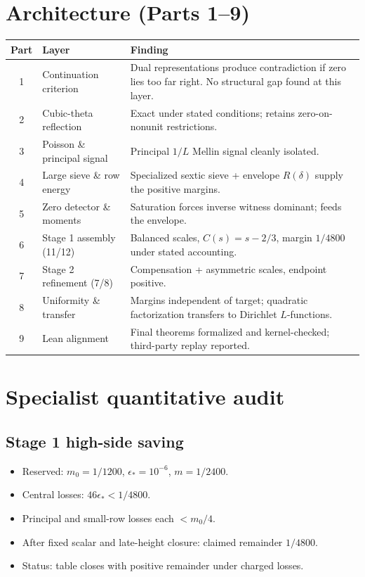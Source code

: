 \documentclass[11pt]{article}
\begin{document}
\section{Architecture (Parts 1--9)}
\begin{center}\small
\begin{tabularx}{\linewidth}{@{}c>{\raggedright\arraybackslash}p{3.9cm}Y@{}}
\toprule
\textbf{Part} & \textbf{Layer} & \textbf{Finding}\\ & Continuation criterion & Dual representations produce contradiction if zero lies too far right. No structural gap found at this layer.\\
2 & Cubic-theta reflection & Exact under stated conditions; retains zero-on-nonunit restrictions.\\
3 & Poisson \& principal signal & Principal $1/L$ Mellin signal cleanly isolated.\\
4 & Large sieve \& row energy & Specialized sextic sieve + envelope $R(\delta)$ supply the positive margins.\\
5 & Zero detector \& moments & Saturation forces inverse witness dominant; feeds the envelope.\\
6 & Stage 1 assembly (11/12) & Balanced scales, $C(s)=s-2/3$, margin $1/4800$ under stated accounting.\\
7 & Stage 2 refinement (7/8) & Compensation + asymmetric scales, endpoint positive.\\
8 & Uniformity \& transfer & Margins independent of target; quadratic factorization transfers to Dirichlet $L$-functions.\\
9 & Lean alignment & Final theorems formalized and kernel-checked; third-party replay reported.\\
\bottomrule
\end{tabularx}\end{center}

\section{Specialist quantitative audit}
\subsection*{Stage 1 high-side saving}
\begin{itemize}[leftmargin=1.4em,itemsep=0.15em]
\item Reserved: $m_0=1/1200$, $\epsilon_*=10^{-6}$, $m=1/2400$.
\item Central losses: $46\epsilon_*<1/4800$.
\item Principal and small-row losses each $<m_0/4$.
\item After fixed scalar and late-height closure: claimed remainder $1/4800$.
\item Status: table closes with positive remainder under charged losses.
\end{itemize}
\end{document}
